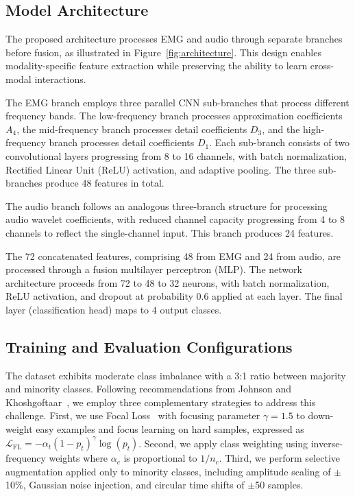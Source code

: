 \documentclass[pdflatex,sn-vancouver-num, iicol]{sn-jnl}
\begin{document}
\subsection{Model Architecture}

The proposed architecture processes EMG and audio through separate branches before fusion, as illustrated in Figure~\ref{fig:architecture}. This design enables modality-specific feature extraction while preserving the ability to learn cross-modal interactions.

The EMG branch employs three parallel CNN sub-branches that process different frequency bands. The low-frequency branch processes approximation coefficients $A_4$, the mid-frequency branch processes detail coefficients $D_3$, and the high-frequency branch processes detail coefficients $D_1$. Each sub-branch consists of two convolutional layers progressing from 8 to 16 channels, with batch normalization, Rectified Linear Unit (ReLU) activation, and adaptive pooling. The three sub-branches produce 48 features in total.

The audio branch follows an analogous three-branch structure for processing audio wavelet coefficients, with reduced channel capacity progressing from 4 to 8 channels to reflect the single-channel input. This branch produces 24 features.

The 72 concatenated features, comprising 48 from EMG and 24 from audio, are processed through a fusion multilayer perceptron (MLP). The network architecture proceeds from 72 to 48 to 32 neurons, with batch normalization, ReLU activation, and dropout at probability 0.6 applied at each layer. The final layer (classification head) maps to $4$ output classes.



\subsection{Training and Evaluation Configurations}

The dataset exhibits moderate class imbalance with a 3:1 ratio between majority and minority classes. Following recommendations from Johnson and Khoshgoftaar~\cite{johnson2019survey}, we employ three complementary strategies to address this challenge. First, we use Focal Loss~\cite{lin2017focal} with focusing parameter $\gamma=1.5$ to down-weight easy examples and focus learning on hard samples, expressed as $\mathcal{L}_{\text{FL}} = -\alpha_t (1-p_t)^\gamma \log(p_t)$. Second, we apply class weighting using inverse-frequency weights where $\alpha_c$ is proportional to $1/n_c$. Third, we perform selective augmentation applied only to minority classes, including amplitude scaling of $\pm$10\%, Gaussian noise injection, and circular time shifts of $\pm$50 samples.
\end{document}
